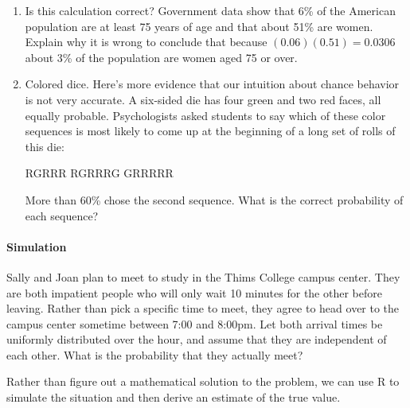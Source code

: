 \documentclass[10pt]{article}\usepackage[]{graphicx}\usepackage[]{color}
\newcommand{\R}{{\sf R}\xspace}
\begin{document}
\begin{enumerate}
  
  
 \vspace{1in}
 
  \item 
  Is this calculation correct? Government data show that 6\% of the American population are at least 75 years of age and that about 51\% are women. Explain why it is wrong to conclude that because $(0.06)(0.51) = 0.0306$ about 3\% of the population are women aged 75 or over. 
  \item 
  Colored dice. Here's more evidence that our intuition about chance behavior is not very accurate. A six-sided die has four green and two red faces, all equally probable. Psychologists asked students to say which of these color sequences is most likely to come up at the beginning of a long set of rolls of this die:
  \begin{center}
  RGRRR \qquad RGRRRG \qquad GRRRRR
  \end{center}
  More than 60\% chose the second sequence. What is the correct probability of each sequence? 

\vspace{1in}
\end{enumerate}


\paragraph{Simulation}

Sally and Joan plan to meet to study in the Thims College campus center.  They are both impatient people who will only wait 10 minutes for the other before leaving.  Rather than pick a specific time to meet, they agree to head over to the campus center sometime between 7:00 and 8:00pm.  Let both arrival times be uniformly distributed over the hour, and assume that they are independent of each other.  What is the probability that they actually meet?  

Rather than figure out a mathematical solution to the problem, we can use \R to simulate the situation and then derive an estimate of the true value. 
\end{document}
